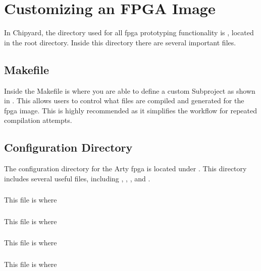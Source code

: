 \section{Customizing an FPGA Image}\label{sec:Customizing}
In Chipyard, the directory used for all \Gls{fpga} prototyping functionality is , located in the root directory.
Inside this directory there are several important files.

\subsection{Makefile}\label{sec:Customizing_FPGA-Makefile}
Inside the Makefile is where you are able to define a custom Subproject as shown in .
This allows users to control what files are compiled and generated for the \Gls{fpga} image.
This is highly recommended as it simplifies the workflow for repeated compilation attempts.

\subsection{Configuration Directory}\label{sec:Customizing_FPGA-Config_Directory}
The configuration directory for the Arty \Gls{fpga} is located under .
This directory includes several useful files, including , , , and .

\subsubsection{}\label{sec:Customizing_FPGA-Configs.scala}
This file is where

\subsubsection{}\label{sec:Customizing_FPGA-HarnessBinders.scala}
This file is where

\subsubsection{}\label{sec:Customizing_FPGA-IOBinders.scala}
This file is where

\subsubsection{}\label{sec:Customizing_FPGA-TestHarness.scala}
This file is where

